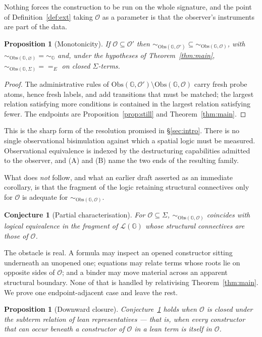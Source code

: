 \documentclass[11pt]{article}
\theoremstyle{plain}
\newtheorem{proposition}[theorem]{Proposition}
\newtheorem{conjecture}[theorem]{Conjecture}
\theoremstyle{definition}
\newcommand{\Gg}{\mathbb{G}}
\newcommand{\Lo}{\mathcal{L}}
\newcommand{\Obs}{\mathrm{Obs}}
\newcommand{\bis}{\sim}
\newcommand{\Ob}{\mathcal{O}}
\begin{document}
Nothing forces the construction to be run on the whole signature, and the point of
Definition~\ref{def:ext} taking $\Ob$ as a parameter is that the observer's instruments are part of the
data.

\begin{proposition}[Monotonicity]
\label{prop:mono}
If $\Ob \subseteq \Ob'$ then $\bis_{\Obs(\Gg,\Ob')} \subseteq \bis_{\Obs(\Gg,\Ob)}$, with
$\bis_{\Obs(\Gg,\varnothing)} = \bis_\Gg$ and, under the hypotheses of Theorem~\ref{thm:main},
$\bis_{\Obs(\Gg,\Sigma)} = {=_E}$ on closed $\Sigma$-terms.
\end{proposition}

\begin{proof}
The administrative rules of $\Obs(\Gg,\Ob')\setminus\Obs(\Gg,\Ob)$ carry fresh probe atoms, hence fresh
labels, and add transitions that must be matched; the largest relation satisfying more conditions is
contained in the largest relation satisfying fewer. The endpoints are Proposition~\ref{prop:still} and
Theorem~\ref{thm:main}.
\end{proof}

This is the sharp form of the resolution promised in \S\ref{sec:intro}. There is no single
observational bisimulation against which a spatial logic must be measured. Observational equivalence is
indexed by the destructuring capabilities admitted to the observer, and (A) and (B) name the two ends
of the resulting family.

What does \emph{not} follow, and what an earlier draft asserted as an immediate corollary, is that the
fragment of the logic retaining structural connectives only for $\Ob$ is adequate for
$\bis_{\Obs(\Gg,\Ob)}$.

\begin{conjecture}[Partial characterisation]
\label{conj:partial}
For $\Ob \subseteq \Sigma$, $\bis_{\Obs(\Gg,\Ob)}$ coincides with logical equivalence in the fragment
of $\Lo(\Gg)$ whose structural connectives are those of $\Ob$.
\end{conjecture}

The obstacle is real. A formula may inspect an opened constructor sitting underneath an unopened one;
equations may relate terms whose roots lie on opposite sides of $\Ob$; and a binder may move material
across an apparent structural boundary. None of that is handled by relativising
Theorem~\ref{thm:main}. We prove one endpoint-adjacent case and leave the rest.

\begin{proposition}[Downward closure]
\label{prop:downward}
Conjecture~\ref{conj:partial} holds when $\Ob$ is closed under the subterm relation of lean
representatives --- that is, when every constructor that can occur beneath a constructor of $\Ob$ in a
lean term is itself in $\Ob$.
\end{proposition}
\end{document}
